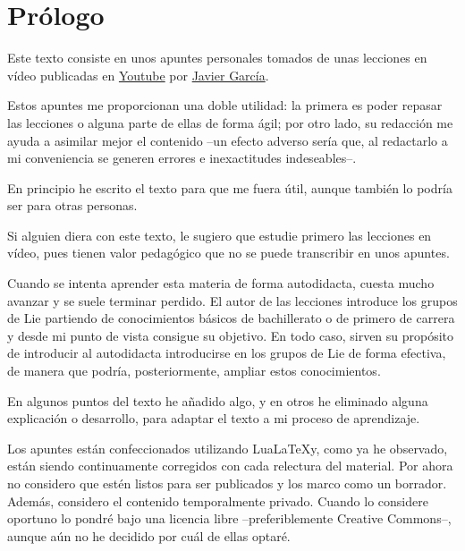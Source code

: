 %

\chapter{Prólogo}
Este texto consiste en unos apuntes personales tomados
de unas lecciones en vídeo publicadas en
\href{%
  https://www.youtube.com/watch?v=4NE-KNwHKSI\&list=PLAnA8FVrBl8DTFTMP8kXbDnRJHQKqfjaw
}
{Youtube}
por \href{https://www.patreon.com/JavierGarcia/}{Javier García}.

Estos apuntes me proporcionan una doble utilidad: la primera es poder repasar las lecciones o alguna parte de ellas de forma ágil; por otro lado, su redacción me ayuda a asimilar mejor el contenido --un efecto adverso sería que, al redactarlo a mi conveniencia se generen errores e inexactitudes indeseables--.

En principio he escrito el texto para que me fuera útil, aunque también lo podría ser para otras personas.

Si alguien diera con este texto, le sugiero que estudie primero las lecciones en vídeo, pues tienen valor pedagógico que no se puede transcribir en unos apuntes.

Cuando se intenta aprender esta materia de forma autodidacta, cuesta mucho avanzar y se suele terminar perdido. El autor de las lecciones introduce los grupos de Lie partiendo de conocimientos básicos de bachillerato o de primero de carrera y desde mi punto de vista consigue su objetivo. En todo caso, sirven su propósito de introducir al autodidacta introducirse en los grupos de Lie de forma efectiva, de manera que podría, posteriormente, ampliar estos conocimientos.

En algunos puntos del texto he añadido algo, y en otros he eliminado alguna explicación o desarrollo, para adaptar el texto a mi proceso de aprendizaje.

Los apuntes están confeccionados utilizando Lua\LaTeX y, como ya he observado, están siendo continuamente corregidos con cada relectura del material. Por ahora no considero que estén listos para ser publicados y los marco como un borrador. Además, considero el contenido temporalmente privado. Cuando lo considere oportuno lo pondré bajo una licencia libre --preferiblemente Creative Commons--, aunque aún no he decidido por cuál de ellas optaré.


 

